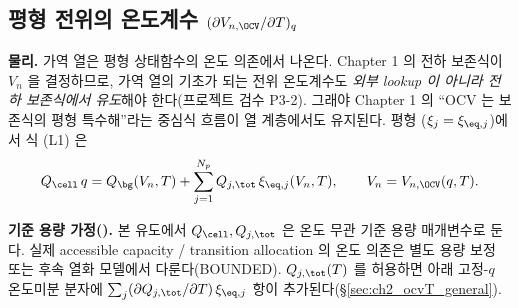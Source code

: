 \subsection{평형 전위의 온도계수 $(\partial V_{n,\OCV}/\partial T)_q$}\label{sec:ch2_ocvT}
\textbf{물리.} 가역 열은 평형 상태함수의 온도 의존에서 나온다. Chapter 1 의 전하 보존식이 $V_n$ 을 결정하므로,
가역 열의 기초가 되는 전위 온도계수도 \emph{외부 lookup 이 아니라 전하 보존식에서 유도}해야 한다(프로젝트 검수
P3-2). 그래야 Chapter 1 의 ``OCV 는 보존식의 평형 특수해''라는 중심식 흐름이 열 계층에서도 유지된다. 평형
($\xi_j=\xi_{\eq,j}$)에서 식 (L1) 은
\begin{equation}
Q_\cell\,q=Q_\bg(V_n,T)+\sum_{j=1}^{N_p}Q_{j,\tot}\,\xi_{\eq,j}(V_n,T),\qquad V_n=V_{n,\OCV}(q,T).
\label{eq:ch2_eqbal}
\end{equation}

\textbf{기준 용량 가정().} 본 유도에서 $Q_\cell,Q_{j,\tot}$ 은 온도 무관 기준 용량 매개변수로 둔다.
실제 accessible capacity / transition allocation 의 온도 의존은 별도 용량 보정 또는 후속 열화 모델에서
다룬다(BOUNDED). $Q_{j,\tot}(T)$ 를 허용하면 아래 고정-$q$ 온도미분 분자에 $\sum_j(\partial Q_{j,\tot}/\partial T)\,\xi_{\eq,j}$
항이 추가된다(\S\ref{sec:ch2_ocvT_general}).

